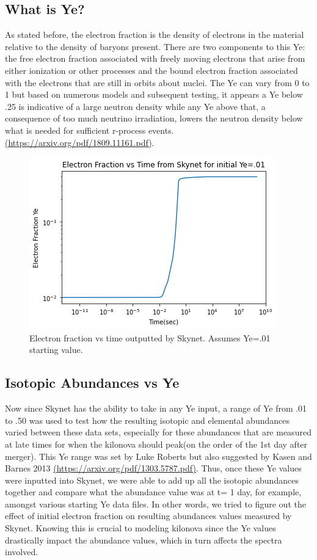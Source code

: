 \documentclass[11pt,a4paper]{article}
\begin{document}
\subsection{What is Ye?}

As stated before, the electron fraction is the density of electrons in the material relative to the density of baryons present. There are two components to this Ye: the free electron fraction associated with freely moving electrons that arise from either ionization or other processes and the bound electron fraction associated with the electrons that are still in orbits about nuclei. The Ye can vary from 0 to 1 but based on numerous models and subsequent testing, it appears a Ye below .25 is indicative of a large neutron density while any Ye above that, a consequence of too much neutrino irradiation, lowers the neutron density below what is needed for sufficient r-process events. \url{(https://arxiv.org/pdf/1809.11161.pdf)}.


\begin{figure}[h!]
  \includegraphics[scale = .75]{Ye_time.png}
  \centering
  \caption{Electron fraction vs time outputted by Skynet. Assumes Ye=.01 starting value. }
\end{figure}


\subsection{Isotopic Abundances vs Ye}

Now since Skynet has the ability to take in any Ye input, a range of Ye from .01 to .50 was used to test how the resulting isotopic and elemental abundances varied between these data sets, especially for these abundances that are measured at late times for when the kilonova should peak(on the order of the 1st day after merger). This Ye range was set by Luke Roberts but also suggested by Kasen and Barnes 2013 \url{(https://arxiv.org/pdf/1303.5787.pdf)}.
Thus, once these Ye values were inputted into Skynet, we were able to add up all the isotopic abundances together and compare what the abundance value was at t= 1 day, for example, amongst various starting Ye data files. In other words, we tried to figure out the effect of initial electron fraction on resulting abundances values measured by Skynet. Knowing this is crucial to modeling kilonova since the Ye values drastically impact the abundance values, which in turn affects the spectra involved.
\end{document}
